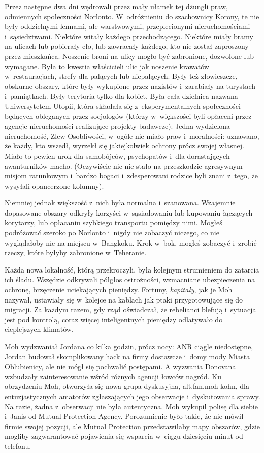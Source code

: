 \documentclass[oneside,polish,11pt,sfheadings]{mwbk}
\begin{document}
Przez następne dwa dni wędrowali przez mały ułamek tej dżungli praw,
odmiennych społeczności Norlonto. W~odróżnieniu do szachownicy Korony,
te nie były oddzielnymi lennami, ale warstwowymi, przeplecionymi
nieruchomościami i~sąsiedztwami. Niektóre witały każdego przechodzącego.
Niektóre miały bramy na ulicach lub pobierały cło, lub zawracały
każdego, kto nie został zaproszony przez mieszkańca. Noszenie broni na
ulicy mogło być zabronione, dozwolone lub wymagane. Była to kwestia
właścicieli ulic jak noszenie krawatów w~restauracjach, strefy dla
palących lub niepalących. Były też złowieszcze, obskurne obszary, które
były wykupione przez nazistów i~zarabiały na turystach i~pamiątkach.
Były terytoria tylko dla kobiet. Była cała dzielnica nazwana
Uniwersytetem Utopii, która składała się z~eksperymentalnych
społeczności będących obleganych przez socjologów (którzy w~większości
byli opłaceni przez agencje nieruchomości realizujące projekty
badawcze). Jedna wydzielona nieruchomość, Zlew Osobliwości, w~ogóle nie
miało praw i~moralności: uznawano, że każdy, kto wszedł, wyrzekł się
jakiejkolwiek ochrony prócz swojej własnej. Miało to pewien urok dla
samobójców, psychopatów i~dla dorastających awanturników macho.
(Oczywiście nic nie stało na przeszkodzie agresywnym misjom ratunkowym i~bardzo bogaci i~zdesperowani rodzice byli znani z~tego, że wysyłali
opancerzone kolumny).

Niemniej jednak większość z~nich była normalna i~szanowana. Wzajemnie
dopasowane obszary odkryły korzyści w~sąsiadowaniu lub kupowaniu
łączących korytarzy, lub opłacaniu szybkiego transportu pomiędzy nimi.
Mogłeś podróżować szeroko po Norlonto i~nigdy nie zobaczyć niczego, co
nie wyglądałoby nie na miejscu w~Bangkoku. Krok w~bok, mogłeś zobaczyć i~zrobić rzeczy, które byłyby zabronione w~Teheranie.

Każda nowa lokalność, którą przekroczyli, była kolejnym strumieniem do
zatarcia ich śladu. Wszędzie odkrywali półgłos ostrożności, wzmacniane
ubezpieczenia na ochronę, brzęczenie uciekających pieniędzy. Fortuny,
\emph{kapitały}, jak je Moh nazywał, ustawiały się w~kolejce na kablach
jak ptaki przygotowujące się do migracji. Za każdym razem, gdy rząd
oświadczał, że rebelianci blefują i~sytuacja jest pod kontrolą, coraz
więcej inteligentnych pieniędzy odlatywało do cieplejszych klimatów.

Moh wydzwaniał Jordana co kilka godzin, prócz nocy: ANR ciągle
niedostępne, Jordan budował skomplikowany hack na firmy dostawcze i~domy
mody Miasta Oblubienicy, ale nie mógł się pochwalić postępami. A
wyzwania Donovana wzbudzały zainteresowanie wśród różnych agencji łowców
nagród. Ku obrzydzeniu Moh, otworzyła się nowa grupa dyskusyjna,
alt.fan.moh-kohn, dla entuzjastycznych amatorów zgłaszających jego
obserwacje i~dyskutowania sprawy. Na razie, żadna z~obserwacji nie była
autentyczna. Moh wykupił polisę dla siebie i~Janis od Mutual Protection
Agency. Porozumienie było takie, że nie mówił firmie swojej pozycji, ale
Mutual Protection przedstawiłaby mapy obszarów, gdzie mogliby
zagwarantować pojawienia się wsparcia w~ciągu dziesięciu minut od
telefonu.
\end{document}
